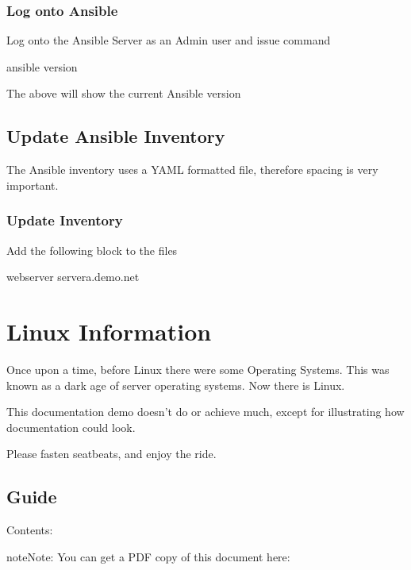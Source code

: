 \documentclass[letterpaper,10pt,english]{sphinxmanual}
\begin{document}
\subsection{Log onto Ansible}
\label{\detokenize{procedures:log-onto-ansible}}
\sphinxAtStartPar
Log onto the Ansible Server as an Admin user and issue command

\begin{sphinxVerbatim}[commandchars=\\\{\}]
ansible \PYGZhy{}\PYGZhy{}version
\end{sphinxVerbatim}

\sphinxAtStartPar
The above will show the current Ansible version


\section{Update Ansible Inventory}
\label{\detokenize{procedures:update-ansible-inventory}}
\sphinxAtStartPar
The Ansible inventory uses a YAML formatted file, therefore spacing is very important.


\subsection{Update Inventory}
\label{\detokenize{procedures:update-inventory}}
\sphinxAtStartPar
Add the following block to the  files

\begin{sphinxVerbatim}[commandchars=\\\{\}]
\PYG{o}{[}webserver\PYG{o}{]}
servera.demo.net
\end{sphinxVerbatim}


\chapter{Linux Information}
\label{\detokenize{index:linux-information}}
\sphinxAtStartPar
Once upon a time, before Linux there were some Operating Systems. This was known as a dark age of server operating systems.
Now there is Linux.

\sphinxAtStartPar
This documentation demo doesn’t do or achieve much, except for illustrating how documentation could look.

\sphinxAtStartPar
Please fasten seatbeats, and enjoy the ride.


\section{Guide}
\label{\detokenize{index:guide}}
\sphinxAtStartPar
Contents:

\begin{sphinxadmonition}{note}{Note:}
\sphinxAtStartPar
You can get a PDF copy of this document here: 
\end{sphinxadmonition}



\renewcommand{\indexname}{Index}
\printindex
\end{document}
